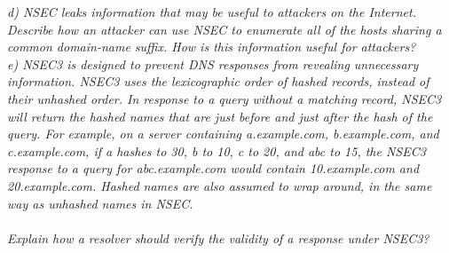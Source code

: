\noindent \textit{d) NSEC leaks information that may be useful to attackers on the Internet. Describe how an attacker can use NSEC to enumerate all of the hosts sharing a common domain-name suffix. How is this information useful for attackers?}\\

\noindent \textit{e) NSEC3 is designed to prevent DNS responses from revealing unnecessary information. NSEC3 uses the lexicographic order of hashed records, instead of their unhashed order. In response to a query without a matching record, NSEC3 will return the hashed names that are just before and just after the hash of the query. For example, on a server containing a.example.com, b.example.com, and c.example.com, if a hashes to 30, b to 10, c to 20, and abc to 15, the NSEC3 response to a query for abc.example.com would contain 10.example.com and 20.example.com. Hashed names are also assumed to wrap around, in the same way as unhashed names in NSEC.\\\\
Explain how a resolver should verify the validity of a response under NSEC3?}\\
